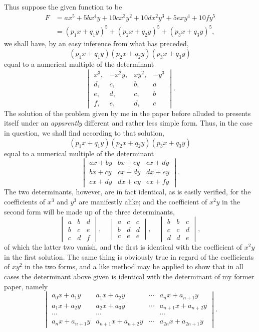 \documentclass[11pt]{article}
\begin{document}
{{Thus suppose the given function to be
\[
\begin{aligned}
F&=ax^5+5bx^4y+10cx^3y^2+10dx^2y^3+5exy^4+10fy^5\\
&=(p_1x+q_1y)^5+(p_2x+q_2y)^5+(p_3x+q_3y)^5,
\end{aligned}
\]
we shall have, by an easy inference from what has preceded,
\[
(p_1x+q_1y)(p_2x+q_2y)(p_3x+q_3y)
\]
equal to a numerical multiple of the determinant
\[
\begin{vmatrix}
x^3,&-x^2y,&xy^2,&-y^3\\
d,&c,&b,&a\\
e,&d,&c,&b\\
f,&e,&d,&c
\end{vmatrix}.
\]
The solution of the problem given by me in the paper before alluded to presents itself under an \emph{apparently} different and rather less simple form. Thus, in the case in question, we shall find according to that solution,
\[
(p_1x+q_1y)(p_2x+q_2y)(p_3x+q_3y)
\]
equal to a numerical multiple of the determinant
\[
\begin{vmatrix}
ax+by&bx+cy&cx+dy\\
bx+cy&cx+dy&dx+ey\\
cx+dy&dx+ey&ex+fy
\end{vmatrix}.
\]
The two determinants, however, are in fact identical, as is easily verified, for the coefficients of $x^3$ and $y^3$ are manifestly alike; and the coefficient of $x^2y$ in the second form will be made up of the three determinants,
\[
\begin{vmatrix}a&b&d\\b&c&e\\c&d&f\end{vmatrix},
\quad
\begin{vmatrix}a&c&c\\b&d&d\\c&e&e\end{vmatrix},
\quad
\begin{vmatrix}b&b&c\\c&c&d\\d&d&e\end{vmatrix},
\]
of which the latter two vanish, and the first is identical with the coefficient of $x^2y$ in the first solution. The same thing is obviously true in regard of the coefficients of $xy^2$ in the two forms, and a like method may be applied to show that in all cases the determinant above given is identical with the determinant of my former paper, namely
\[
\begin{vmatrix}
a_0x+a_1y&a_1x+a_2y&\cdots&a_nx+a_{n+1}y\\
a_1x+a_2y&a_2x+a_3y&\cdots&a_{n+1}x+a_{n+2}y\\
\cdots&\cdots&&\cdots\\
a_nx+a_{n+1}y&a_{n+1}x+a_{n+2}y&\cdots&a_{2n}x+a_{2n+1}y
\end{vmatrix}.
\]

}}
\end{document}
